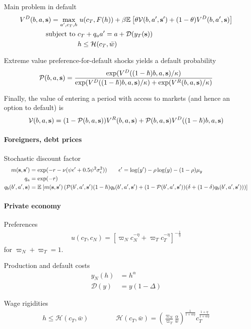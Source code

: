 Main problem in default
\begin{align}
	V^D(b,a,\text{\textbf{s}}) = \max_{a',c_T, h} &\; u(c_T, F(h)) + \beta \mathbb{E}_{{}}\left[  \theta \mathcal{V}(b,a',\text{\textbf{s}}') + (1-\theta) V^D(b,a',\text{\textbf{s}})  \right] \\
	\text{subject to }
	& c_T + q_a a' = a + \mathcal{D}(y_T(\text{\textbf{s}})) \notag \\
	& h \leq \mathcal{H}(c_T, \bar{w}) \notag
\end{align}

Extreme value preference-for-default shocks yields a default probability
\begin{align}
	\mathcal{P}(b,a,\text{\textbf{s}}) = \frac{ \exp(V^D((1-\hslash)b,a,\text{\textbf{s}}) / \kappa) }{\exp(V^D((1-\hslash)b,a,\text{\textbf{s}}) / \kappa) + \exp(V^R(b,a,\text{\textbf{s}}) / \kappa)}
\end{align}

Finally, the value of entering a period with access to markets (and hence an option to default) is
\begin{align}
	\mathcal{V}(b,a,\text{\textbf{s}}) = (1-\mathcal{P}(b,a,\text{\textbf{s}})) V^R(b,a,\text{\textbf{s}}) + \mathcal{P}(b,a,\text{\textbf{s}}) V^D((1-\hslash)b,a,\text{\textbf{s}})
\end{align}

\paragraph{Foreigners, debt prices}
Stochastic discount factor
\begin{align}
	m(\text{\textbf{s}}, \text{\textbf{s}}') &= \exp(-r - \nu (\psi \epsilon' + 0.5 \psi^2\sigma_\epsilon^2)) \qquad \epsilon' = \log(y') - \rho\log(y) - (1-\rho)\mu_y\\
	q_a &= \exp(-r) \\
	q_b(b',a',\text{\textbf{s}}) &= \mathbb{E}_{{}}\left[  m(\text{\textbf{s}},\text{\textbf{s}}') \left(\mathcal{P}(b',a',\text{\textbf{s}}') (1-\hslash) q_b(b',a',\text{\textbf{s}}') + (1-\mathcal{P}(b',a',\text{\textbf{s}}'))(\delta + (1-\delta)q_b(b',a',\text{\textbf{s}}')) \right)  \right]
\end{align}

\paragraph{Private economy}
Preferences
\begin{align}
	u(c_T,c_N) = \left[ \varpi_N c_N^{-\eta} + \varpi_T c_T^{-\eta} \right]^{-\frac{1}{\eta}}
\end{align}
for $\varpi_N + \varpi_T = 1$.

Production and default costs
\begin{align}
	y_N(h) &= h^\alpha \\
	\mathcal{D}(y) &= y (1-\Delta)
\end{align}

Wage rigidities
\begin{align}
	h \leq \mathcal{H}(c_T, \bar{w}) \qquad\qquad \mathcal{H}(c_T, \bar{w}) = \left(\frac{\varpi_N}{\varpi_T} \frac{\alpha}{\bar{w}}\right)^\frac{1}{1+\alpha\eta} c_T^\frac{1+\eta}{1+\alpha\eta}
\end{align}

